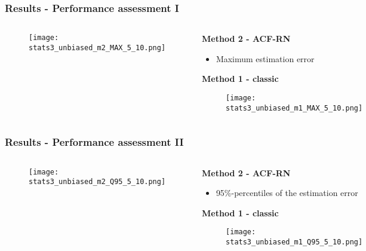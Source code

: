 \documentclass[11pt,aspectratio=169]{beamer}
\begin{document}
	\begin{frame}
		\frametitle{Results - Performance assessment I}
		\begin{columns}[t]
			\begin{RIPcolleft}
				\begin{figure}
					\texttt{[image: stats3\_unbiased\_m2\_MAX\_5\_10.png]}
				\end{figure}
			\end{RIPcolleft}
			\begin{RIPcolright}
				\textbf{Method 2 - ACF-RN}\\
				\begin{itemize}
					\item Maximum estimation error
				\end{itemize}
				\vspace{.5em}
				\textbf{Method 1 - classic}\\
				\begin{figure}
					\texttt{[image: stats3\_unbiased\_m1\_MAX\_5\_10.png]}
				\end{figure}
			\end{RIPcolright}
		\end{columns}
	\end{frame}
	\begin{frame}
		\frametitle{Results - Performance assessment II}
		\begin{columns}[t]
			\begin{RIPcolleft}
				\begin{figure}
					\texttt{[image: stats3\_unbiased\_m2\_Q95\_5\_10.png]}
				\end{figure}
			\end{RIPcolleft}
			\begin{RIPcolright}
				\textbf{Method 2 - ACF-RN}\\
				\begin{itemize}
					\item 95\%-percentiles of the estimation error
				\end{itemize}
				\vspace{.5em}
				\textbf{Method 1 - classic}\\
				\begin{figure}
					\texttt{[image: stats3\_unbiased\_m1\_Q95\_5\_10.png]}
				\end{figure}
			\end{RIPcolright}
		\end{columns}
	\end{frame}
\end{document}
